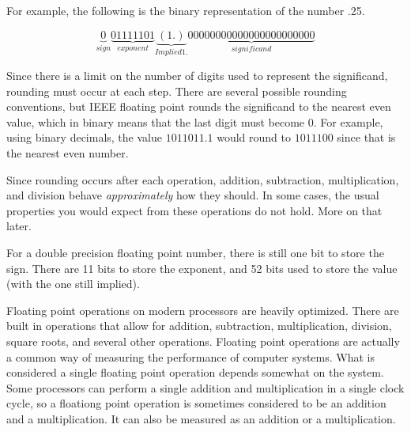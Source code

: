 For example, the following is the binary representation of the number .25.

\begin{equation*}
\underbrace{0}_{sign} \underbrace{01111101}_{exponent}\underbrace{(1.)}_{Implied 1.} \underbrace{00000000000000000000000}_{significand}
\end{equation*}

Since there is a limit on the number of digits used to represent the significand, rounding must occur at each step.
There are several possible rounding conventions, but IEEE floating point rounds the significand to the nearest even value, which in binary means that the last digit must become 0.
For example, using binary decimals, the value $1011011.1$ would round to $1011100$ since that is the nearest even number.

Since rounding occurs after each operation, addition, subtraction, multiplication, and division behave \textit{approximately} how they should.
In some cases, the usual properties you would expect from these operations do not hold.
More on that later.

For a double precision floating point number, there is still one bit to store the sign.
There are 11 bits to store the exponent, and 52 bits used to store the value (with the one still implied).

Floating point operations on modern processors are heavily optimized.
There are built in operations that allow for addition, subtraction, multiplication, division, square roots, and several other operations.
Floating point operations are actually a common way of measuring the performance of computer systems.
What is considered a single floating point operation depends somewhat on the system.
Some processors can perform a single addition and multiplication in a single clock cycle, so a floationg point operation is sometimes considered to be an addition and a multiplication.
It can also be measured as an addition or a multiplication.

